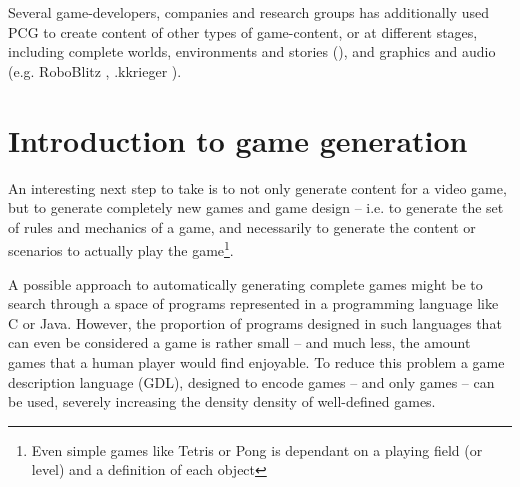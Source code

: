 \documentclass[a4paper,titlepage,final]{report}
\begin{document}
Several game-developers, companies and research groups has additionally used PCG to create content of other types of game-content, or at different stages, including complete worlds, environments and stories (\citep{game:dwarffortress}), and graphics and audio (e.g. RoboBlitz \citep{game:roboblitz}, .kkrieger \citep{game:kkrieger}).





\section{Introduction to game generation}
\label{sec_introtogamegen}
An interesting next step to take is to not only generate content for a video game, but to generate completely new games and game design -- i.e. to generate the set of rules and mechanics of a game, and necessarily to generate the content or scenarios to actually play the game\footnote{Even simple games like Tetris or Pong is dependant on a playing field (or level) and a definition of each object}.

A possible approach to automatically generating complete games might be to search through a space of programs represented in a programming language like C or Java. 
However, the proportion of programs designed in such languages that can even be considered a game is rather small -- and much less, the amount games that a human player would find enjoyable.
To reduce this problem a game description language (GDL), designed to encode games -- and only games -- can be used, severely increasing the density density of well-defined games.
\end{document}
